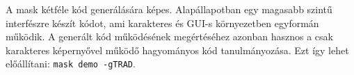 A mask kétféle kód generálására képes. Alapállapotban egy magasabb 
szintű interfészre készít kódot, ami karakteres és GUI-s környezetben
egyformán működik. A generált kód működésének megértéséhez azonban
hasznos a csak karakteres képernyővel működő hagyományos kód tanulmányozása. 
Ezt így lehet előállítani: \verb'mask demo -gTRAD'.








